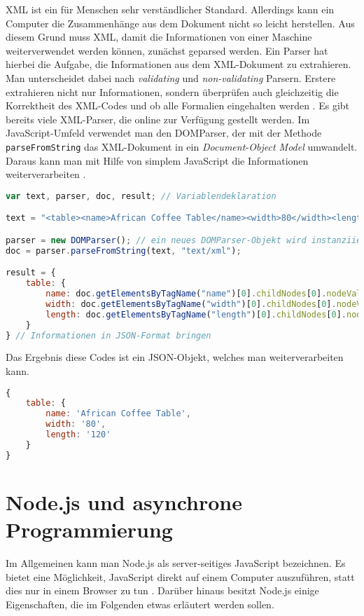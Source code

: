 XML ist ein für Menschen sehr verständlicher Standard. Allerdings kann ein Computer die Zusammenhänge aus dem Dokument nicht so leicht herstellen. Aus diesem Grund muss \ac{XML}, damit die Informationen von einer Maschine weiterverwendet werden können, zunächst geparsed werden. Ein Parser hat hierbei die Aufgabe, die Informationen aus dem \ac{XML}-Dokument zu extrahieren. Man unterscheidet dabei nach \textit{validating} und \textit{non-validating} Parsern. Erstere extrahieren nicht nur Informationen, sondern überprüfen auch gleichzeitig die Korrektheit des \ac{XML}-Codes und ob alle Formalien eingehalten werden \cite{pars}. Es gibt bereits viele \ac{XML}-Parser, die online zur Verfügung gestellt werden. Im JavaScript-Umfeld verwendet man den DOMParser, der mit der Methode \texttt{parseFromString} das \ac{XML}-Dokument in ein \textit{Document-Object Model} umwandelt. Daraus kann man mit Hilfe von simplem JavaScript die Informationen weiterverarbeiten \cite{w3pars}. \\

\begin{lstlisting}[title=Verwendung des DOMParsers für XML, language=JavaScript]
var text, parser, doc, result; // Variablendeklaration

text = "<table><name>African Coffee Table</name><width>80</width><length>120</length></table>"; // der zu parsende Text

parser = new DOMParser(); // ein neues DOMParser-Objekt wird instanziiert
doc = parser.parseFromString(text, "text/xml");

result = {
	table: {
		name: doc.getElementsByTagName("name")[0].childNodes[0].nodeValue,
		width: doc.getElementsByTagName("width")[0].childNodes[0].nodeValue,
		length: doc.getElementsByTagName("length")[0].childNodes[0].nodeValue
	}
} // Informationen in JSON-Format bringen
\end{lstlisting}

Das Ergebnis diese Codes ist ein JSON-Objekt, welches man weiterverarbeiten kann. \\

\begin{lstlisting}[title=Ergebnis nach dem Parsen, language=JavaScript]
{
	table: {
		name: 'African Coffee Table',
		width: '80',
		length: '120'
	}
}
\end{lstlisting}



\newpage

\section{Node.js und asynchrone Programmierung}
Im Allgemeinen kann man Node.js als server-seitiges JavaScript bezeichnen. Es bietet eine Möglichkeit, JavaScript direkt auf einem Computer auszuführen, statt dies nur in einem Browser zu tun \cite{njsspec}. Darüber hinaus besitzt Node.js einige Eigenschaften, die im Folgenden etwas erläutert werden sollen.

